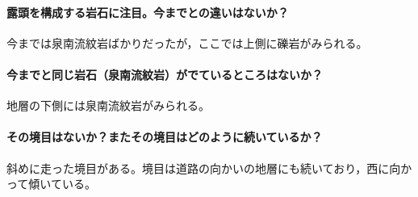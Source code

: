 \documentclass[uplatex,b5paper]{jsreport}
\begin{document}
      \paragraph{露頭を構成する岩石に注目。今までとの違いはないか？}
      今までは泉南流紋岩ばかりだったが，ここでは上側に礫岩がみられる。
      \paragraph{今までと同じ岩石（泉南流紋岩）がでているところはないか？}
      地層の下側には泉南流紋岩がみられる。
      \paragraph{その境目はないか？またその境目はどのように続いているか？}
      斜めに走った境目がある。境目は道路の向かいの地層にも続いており，西に向かって傾いている。
\end{document}
